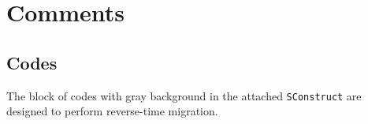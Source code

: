 \section{}
\section{}
\section{}
\section{}
\section{}
\section{}
\section{Comments}
\subsection{Codes}
The block of codes with gray background in the attached \texttt{SConstruct} are
designed to perform reverse-time migration.
